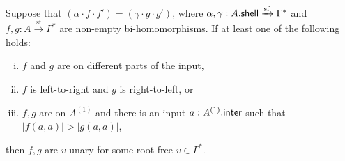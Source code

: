 \begin{lemma}\label{lem:bi-homomorphisms-causes-for-unarity}
    Suppose that $(\alpha \cdot f  \cdot f') = (\gamma \cdot g \cdot g')$, where $\alpha, \gamma : A . \mathsf{shell} \xrightarrow{\mathrm{sf}} \Gamma^*$ and $f,g : A \xrightarrow{\mathrm{sf}} \Gamma^*$ are non-empty bi-homomorphisms. If at least one of the following holds:
    \begin{enumerate}[(i)]
        \item $f$ and $g$ are on different parts of the input,
        \item $f$ is left-to-right and $g$ is right-to-left, or
        \item $f, g$ are on $A^{(1)}$ and there is an input $a : A^{(1)} . \mathsf{inter}$ such that $|f(a,a)| > |g(a,a)|$,
    \end{enumerate}
    then $f,g$ are $v$-unary for some root-free $v \in \Gamma^*$.
\end{lemma}


